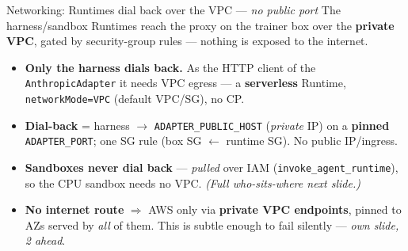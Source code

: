 \documentclass[aspectratio=169]{beamer}
\begin{document}
\begin{frame}{Networking: Runtimes dial back over the VPC --- \emph{no public port}}
  \footnotesize The harness/sandbox Runtimes reach the proxy on the trainer box over the
  \textbf{private VPC}, gated by security-group rules --- nothing is exposed to the internet.
  \begin{center}
  \end{center}
  \vspace{-0.1em}
  \begin{itemize}\setlength\itemsep{0.1em}
    \item \textbf{Only the harness dials back.} As the HTTP client of the \texttt{AnthropicAdapter} it
      needs VPC egress --- a \textbf{serverless} Runtime, \texttt{networkMode=VPC} (default VPC/SG), no CP.
    \item \textbf{Dial-back} = harness $\to$ \texttt{ADAPTER\_PUBLIC\_HOST} (\emph{private} IP) on a
      \textbf{pinned} \texttt{ADAPTER\_PORT}; one SG rule (box SG $\leftarrow$ runtime SG). No public IP/ingress.
    \item \textbf{Sandboxes never dial back} --- \emph{pulled} over IAM (\texttt{invoke\_agent\_runtime}),
      so the CPU sandbox needs no VPC. \emph{(Full who-sits-where next slide.)}
    \item \textbf{No internet route} $\Rightarrow$ AWS only via \textbf{private VPC endpoints},
      pinned to AZs served by \emph{all} of them. This is subtle enough to fail silently --- \emph{own slide, 2 ahead}.
  \end{itemize}
\end{frame}
\end{document}
